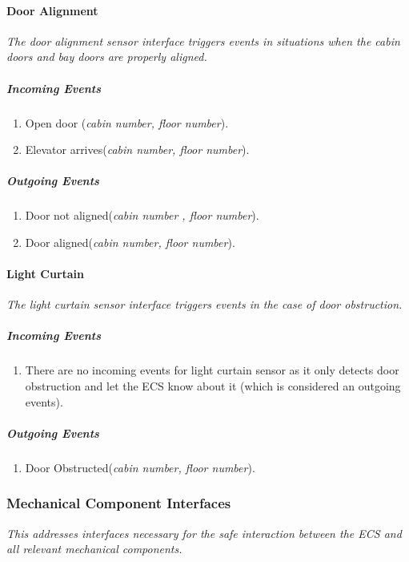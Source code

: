 \documentclass[12pt]{article}
\begin{document}
			\paragraph{Door Alignment}
			\textit{The door alignment sensor interface triggers events in situations 
			when the cabin doors and bay doors are properly aligned.}
				\subparagraph{Incoming Events}
					\begin{enumerate}
						\item Open door (\textit{cabin number, floor number}).
						\item Elevator arrives(\textit{cabin number, floor number}).
					\end{enumerate}
				\subparagraph{Outgoing Events}
					\begin{enumerate}
						\item Door not aligned(\textit{cabin number , floor number}).
						\item Door aligned(\textit{cabin number, floor number}).
					\end{enumerate}
							
			
			\paragraph{Light Curtain}
			\textit{The light curtain sensor interface triggers events in 
			the case of door obstruction.}
				\subparagraph{Incoming Events}
					\begin{enumerate}
						\item There are no incoming events for light curtain sensor as it only 
						detects door obstruction and let the ECS know about it (which is 
						considered an outgoing events).
					\end{enumerate}
				
				\subparagraph{Outgoing Events}
					\begin{enumerate}
						\item Door Obstructed(\textit{cabin number, floor number}).
					\end{enumerate}
		
		
		
		\subsubsection{Mechanical Component Interfaces}
		\textit{This addresses interfaces necessary for the safe interaction
		between the \textit{ECS} and all relevant mechanical components.}
		
\end{document}

